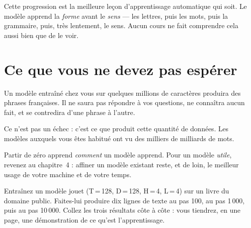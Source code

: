\begin{nkretenir}
Cette progression est la meilleure leçon d'apprentissage automatique qui soit.
Le modèle apprend la \emph{forme} avant le \emph{sens} — les lettres, puis les
mots, puis la grammaire, puis, très lentement, le sens. Aucun cours ne fait
comprendre cela aussi bien que de le voir.
\end{nkretenir}

\section{Ce que vous ne devez pas espérer}

Un modèle entraîné chez vous sur quelques millions de caractères produira des
phrases françaises. Il ne saura pas répondre à vos questions, ne connaîtra aucun
fait, et se contredira d'une phrase à l'autre.

Ce n'est pas un échec : c'est ce que produit cette quantité de données. Les
modèles auxquels vous êtes habitué ont vu des milliers de milliards de mots.

\begin{nkretenir}
Partir de zéro apprend \emph{comment} un modèle apprend. Pour un modèle
\emph{utile}, revenez au chapitre~4 : affiner un modèle existant reste, et de
loin, le meilleur usage de votre machine et de votre temps.
\end{nkretenir}

\begin{nkexo}
Entraînez un modèle jouet (T\,=\,128, D\,=\,128, H\,=\,4, L\,=\,4) sur un livre
du domaine public. Faites-lui produire dix lignes de texte au pas 100, au pas
1\,000, puis au pas 10\,000. Collez les trois résultats côte à côte : vous
tiendrez, en une page, une démonstration de ce qu'est l'apprentissage.
\end{nkexo}
